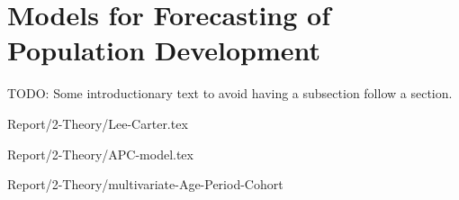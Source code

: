 \section{Models for Forecasting of Population Development}
\label{sec:ModelsPopulationDevelopment}

\textcolor{myDarkGreen}{TODO: Some introductionary text to avoid having a subsection follow a section. }

{Report/2-Theory/Lee-Carter.tex}

{Report/2-Theory/APC-model.tex}

{Report/2-Theory/multivariate-Age-Period-Cohort}